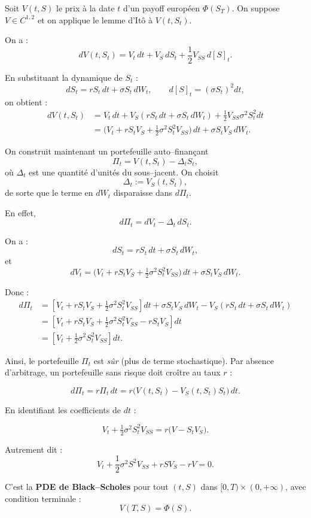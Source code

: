 \documentclass[11pt,a4paper]{article}
\newcommand{\1}{\mathbf{1}}
\begin{document}
Soit $V(t,S)$ le prix \`a la date $t$ d'un payoff europ\'een $\Phi(S_T)$.
On suppose $V \in C^{1,2}$ et on applique le lemme d'It\^{o} \`a $V(t,S_t)$.

On a :
\[
dV(t,S_t) = V_t\, dt + V_S\, dS_t
+ \frac12 V_{SS}\, d[S]_t.
\]

En substituant la dynamique de $S_t$ :
\[
dS_t = r S_t\,dt + \sigma S_t\, dW_t,
\qquad
d[S]_t = (\sigma S_t)^2 dt,
\]
on obtient :
\[
\begin{aligned}
dV(t,S_t)
&= V_t\, dt
 + V_S (r S_t\,dt + \sigma S_t\, dW_t)
 + \frac12 V_{SS} \sigma^2 S_t^2 dt \\
&= \bigl( V_t + r S_t V_S + \tfrac12 \sigma^2 S_t^2 V_{SS} \bigr)\, dt
 + \sigma S_t V_S\, dW_t.
\end{aligned}
\]

On construit maintenant un portefeuille auto--finan\c{c}ant
\[
\Pi_t = V(t,S_t) - \Delta_t S_t,
\]
o\`u $\Delta_t$ est une quantit\'e d'unit\'es du sous--jacent.
On choisit
\[
\Delta_t := V_S(t,S_t),
\]
de sorte que le terme en $dW_t$ disparaisse dans $d\Pi_t$.

En effet,
\[
d\Pi_t = dV_t - \Delta_t\, dS_t.
\]

On a :
\[
dS_t = r S_t\,dt + \sigma S_t\, dW_t,
\]
et
\[
dV_t =
\bigl( V_t + r S_t V_S + \tfrac12 \sigma^2 S_t^2 V_{SS} \bigr)\, dt
+ \sigma S_t V_S\, dW_t.
\]

Donc :
\[
\begin{aligned}
d\Pi_t
&= \left[
V_t + r S_t V_S + \tfrac12 \sigma^2 S_t^2 V_{SS}
\right] dt
+ \sigma S_t V_S\, dW_t
- V_S (r S_t\,dt + \sigma S_t\, dW_t) \\
&= \left[
V_t + r S_t V_S + \tfrac12 \sigma^2 S_t^2 V_{SS}
- r S_t V_S
\right] dt \\
&= \left[
V_t + \tfrac12 \sigma^2 S_t^2 V_{SS}
\right] dt.
\end{aligned}
\]

Ainsi, le portefeuille $\Pi_t$ est \emph{sûr} (plus de terme stochastique).
Par absence d'arbitrage, un portefeuille sans risque doit cro\^{i}tre au taux $r$ :

\[
d\Pi_t = r \Pi_t\,dt = r\bigl(V(t,S_t) - V_S(t,S_t) S_t\bigr)\,dt.
\]

En identifiant les coefficients de $dt$ :

\[
V_t + \tfrac12 \sigma^2 S_t^2 V_{SS}
= r\bigl(V - S_t V_S\bigr).
\]

Autrement dit :
\[
V_t + \frac12 \sigma^2 S^2 V_{SS} + r S V_S - r V = 0.
\]

C'est la \textbf{PDE de Black--Scholes} pour tout $(t,S)$ dans $[0,T)\times(0,+\infty)$,
avec condition terminale :
\[
V(T,S) = \Phi(S).
\]
\end{document}
